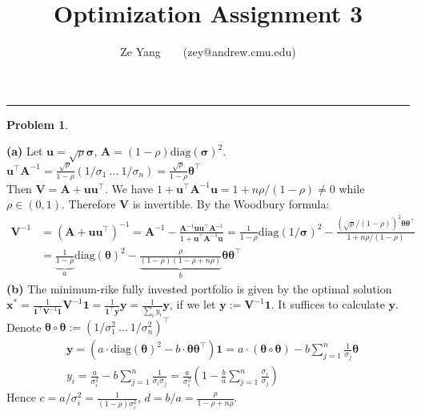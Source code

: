\documentclass[a4paper, 8pt]{article}
\title{\textbf{Optimization Assignment 3}}
\author{Ze Yang~~~~(zey@andrew.cmu.edu)}
\theoremstyle{definition}
\newtheorem{problem}{Problem}
\theoremstyle{hSol}
\begin{document}
\maketitle

\noindent\rule{16cm}{0.4pt}
\begin{problem}
\end{problem}
\textbf{(a)} Let $\bm{u} = \sqrt{\rho} \bm{\sigma}$, $\bm{A}=(1-\rho) \text{diag}(\bm{\sigma})^2$. $\bm{u}^{\top}\bm{A}^{-1} = \frac{\sqrt{\rho}}{1-\rho}(1/\sigma_1~...~1/\sigma_n) = \frac{\sqrt{\rho}}{1-\rho}\bm{\theta}^{\top}$ \\
 Then $\bm{V} = \bm{A} + \bm{u}\bm{u}^{\top}$. We have $1+ \bm{u}^{\top} \bm{A}^{-1}\bm{u} = 1 + n\rho/(1-\rho) \ne 0$ while $\rho \in (0,1)$. Therefore $\bm{V}$ is invertible. By the Woodbury formula:
 \begin{equation}
 	\begin{split}
 		\bm{V}^{-1} &= (\bm{A} + \bm{u}\bm{u}^{\top})^{-1} = \bm{A}^{-1} - \frac{\bm{A}^{-1} \bm{u}\bm{u}^{\top}\bm{A}^{-1}}{1+ \bm{u}^{\top} \bm{A}^{-1}\bm{u}} = \frac{1}{1-\rho}\text{diag}(1/\bm{\sigma})^2 - \frac{(\sqrt{\rho}/(1-\rho))^2  \bm{\theta}\bm{\theta}^{\top}}{1 + n\rho/(1-\rho)} \\
 		&= \underbrace{\frac{1}{1-\rho}}_{a}\text{diag}(\bm{\theta})^2 - \underbrace{\frac{\rho}{(1-\rho)(1-\rho+n\rho)}}_{b}\bm{\theta}\bm{\theta}^{\top}
 	\end{split}
 \end{equation}
 \textbf{(b)} The minimum-rike fully invested portfolio is given by the optimal solution $\bm{x}^* = \frac{1}{\bm{1}^{\top} \bm{V}^{-1} \bm{1}}\bm{V}^{-1}\bm{1} = \frac{1}{\bm{1}^{\top}\bm{y}} \bm{y} = \frac{1}{\sum_i y_i} \bm{y}$, if we let $\bm{y}:=\bm{V}^{-1} \bm{1}$. It suffices to calculate $\bm{y}$. Denote $\bm{\theta}\circ \bm{\theta}:=(1/\sigma_1^2~...~1/\sigma_n^2)^{\top}$
 \begin{equation}
 	\begin{split}
 		&\bm{y} = (a\cdot\text{diag}(\bm{\theta})^2 - b\cdot\bm{\theta}\bm{\theta}^{\top}) \bm{1} = a\cdot (\bm{\theta}\circ \bm{\theta}) - b\sum_{j=1}^n \frac{1}{\sigma_j} \bm{\theta} \\
 		&y_i = \frac{a}{\sigma_i^2} - b\sum_{j=1}^n \frac{1}{\sigma_i\sigma_j} = \frac{a}{\sigma^2_i}\left(1-\frac{b}{a}\sum_{j=1}^n \frac{\sigma_i}{\sigma_j}\right)
 	\end{split}
 \end{equation}
 Hence $c=a/\sigma_i^2=\frac{1}{(1-\rho)\sigma_i^2}$, $d=b/a = \frac{\rho}{1-\rho+n\rho}$.
\end{document}
